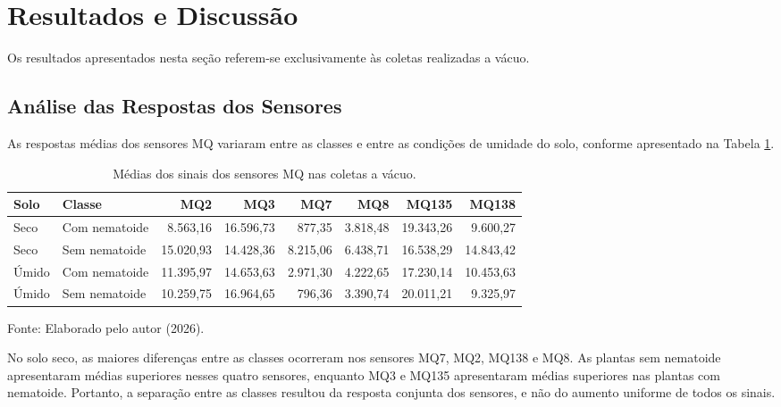 \section{Resultados e Discussão}

Os resultados apresentados nesta seção referem-se exclusivamente às coletas
realizadas a vácuo.

\subsection{Análise das Respostas dos Sensores}

As respostas médias dos sensores MQ variaram entre as classes e entre as
condições de umidade do solo, conforme apresentado na Tabela
\ref{tab:medias_mq_vacuo}.

\begin{table}[htbp]
    \centering
    \caption{Médias dos sinais dos sensores MQ nas coletas a vácuo.}
    \label{tab:medias_mq_vacuo}
    \scriptsize
    \begin{tabular}{llrrrrrr}
        \hline
        \textbf{Solo} & \textbf{Classe} & \textbf{MQ2} & \textbf{MQ3} &
        \textbf{MQ7} & \textbf{MQ8} & \textbf{MQ135} & \textbf{MQ138} \\
        \hline
        Seco  & Com nematoide  & 8.563,16  & 16.596,73 & 877,35   & 3.818,48 & 19.343,26 & 9.600,27  \\
        Seco  & Sem nematoide  & 15.020,93 & 14.428,36 & 8.215,06 & 6.438,71 & 16.538,29 & 14.843,42 \\
        Úmido & Com nematoide  & 11.395,97 & 14.653,63 & 2.971,30 & 4.222,65 & 17.230,14 & 10.453,63 \\
        Úmido & Sem nematoide  & 10.259,75 & 16.964,65 & 796,36   & 3.390,74 & 20.011,21 & 9.325,97  \\
        \hline
    \end{tabular}

    \vspace{0.1cm}
    {\footnotesize Fonte: Elaborado pelo autor (2026).}
\end{table}

No solo seco, as maiores diferenças entre as classes ocorreram nos sensores
MQ7, MQ2, MQ138 e MQ8. As plantas sem nematoide apresentaram médias superiores
nesses quatro sensores, enquanto MQ3 e MQ135 apresentaram médias superiores nas
plantas com nematoide. Portanto, a separação entre as classes resultou da
resposta conjunta dos sensores, e não do aumento uniforme de todos os sinais.

